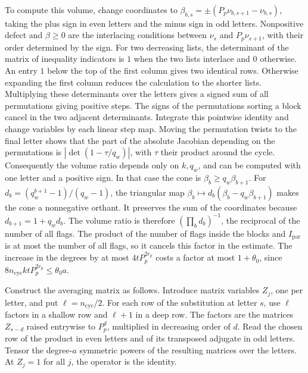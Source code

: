 To compute this volume, change coordinates to
\(\beta_{b,s}=\pm(P_p\nu_{b,s+1}-\nu_{b,s})\), taking the plus sign
in even letters and the minus sign in odd letters.
Nonpositive defect and \(\beta\ge0\) are the interlacing
conditions between \(\nu_s\) and \(P_p\nu_{s+1}\), with their
order determined by the sign. For two decreasing lists, the
determinant of the matrix of inequality indicators is \(1\)
when the two lists interlace and \(0\) otherwise.
An entry \(1\) below the top of the first column gives two
identical rows. Otherwise expanding the first column reduces
the calculation to the shorter lists.
Multiplying these determinants over the letters gives a signed
sum of all permutations giving positive steps. The signs of
the permutations sorting a block cancel in the two adjacent
determinants. Integrate this pointwise identity and change
variables by each linear step map. Moving the permutation
twists to the final letter shows that the part of the absolute
Jacobian depending on the permutations is
\(|\det(1-\tau/q_w)|\), with \(\tau\) their product around the cycle.
Consequently the volume ratio depends only on \(k,q_w\), and
can be computed with one letter and a positive sign.
In that case the cone is \(\beta_b\ge q_w\beta_{b+1}\).
For \(d_b=(q_w^{b+1}-1)/(q_w-1)\), the triangular map
\(\beta_b\mapsto d_b(\beta_b-q_w\beta_{b+1})\) makes the cone a
nonnegative orthant. It preserves the sum of the coordinates
because \(d_{b+1}=1+q_wd_b\). The volume ratio is therefore
\((\prod_b d_b)^{-1}\), the reciprocal of the number of all flags.
The product of the number of flags inside the blocks and
\(I_\mathrm{par}\) is at most the number of all flags, so it
cancels this factor in the estimate.
The increase in the degrees by at most \(4tP_p^{2r_p}\) costs a factor
at most \(1+\theta_0\), since
\(8n_\mathrm{cyc}ktP_p^{2r_p}\le\theta_0 a\).

Construct the averaging matrix as follows. Introduce matrix
variables \(Z_j\), one per letter, and put \(\ell=n_\mathrm{cyc}/2\).
For each row of the substitution at letter \(s\), use \(\ell\)
factors in a shallow row and \(\ell+1\) in a deep row.
The factors are the matrices \(Z_{s-d}\) raised entrywise to
\(P_p^d\), multiplied in decreasing order of \(d\). Read the
chosen row of the product in even letters and of its transposed
adjugate in odd letters. Tensor the degree-\(a\) symmetric
powers of the resulting matrices over the letters.
At \(Z_j=1\) for all \(j\), the operator is the identity.

